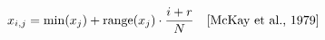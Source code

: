 \documentclass[preview]{standalone}
\begin{document}
\begin{align*}
\special{dvisvgm:raw <g id='unique000'>}x_{i,j} = \min(x_j) + \text{range}(x_j) \cdot \frac{i + r}{N} \quad \text{[McKay et al., 1979]}\special{dvisvgm:raw </g>}
\end{align*}
\end{document}
